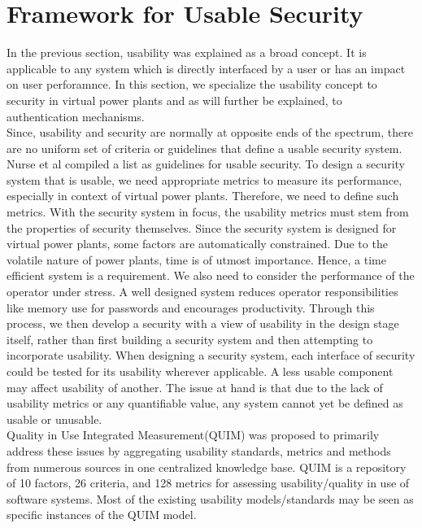 \section{Framework for Usable Security}
In the previous section, usability was explained as a broad concept. It is applicable to any system which is directly interfaced by a user or has an impact on user perforamnce. In this section, we specialize the usability concept to security in virtual power plants and as will further be explained, to authentication mechanisms.\\ Since, usability and security are normally at opposite ends of the spectrum, there are no uniform set of criteria or guidelines that define a usable security system. Nurse et al\cite{nurse2011guidelines} compiled a list as guidelines for usable security.
\newline
To design a security system that is usable, we need appropriate metrics to measure its performance, especially in context of virtual power plants. Therefore, we need to define such metrics. With the security system in focus, the usability metrics must stem from the properties of security themselves. Since the security system is designed for virtual power plants, some factors are automatically constrained. Due to the volatile nature of power plants, time is of utmost importance. Hence, a time efficient system is a requirement. We also need to consider the performance of the operator under stress. A well designed system reduces operator responsibilities like memory use for passwords and encourages productivity. Through this process, we then develop a security with a view of usability in the design stage itself, rather than first building a security system and then attempting to incorporate usability. When designing a security system, each interface of security could be tested for its usability wherever applicable. A less usable component may affect usability of another. The issue at hand is that due to the lack of usability metrics or any quantifiable value, any system cannot yet be defined as usable or unusable. \\


Quality in Use Integrated Measurement(QUIM)\cite{seffah2001quim} was proposed to primarily address these issues by aggregating usability standards, metrics and methods from numerous sources in one centralized knowledge base. QUIM is a repository of 10 factors, 26 criteria, and 128 metrics for assessing usability/quality in use of software systems. Most of the existing usability models/standards may be seen as specific instances of the QUIM model. \\

